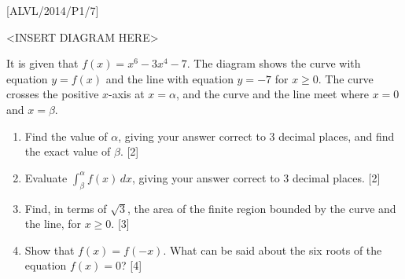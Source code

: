\item {[}ALVL/2014/P1/7{]}
\noindent \begin{center}
<INSERT DIAGRAM HERE>
\par\end{center}

It is given that $f\left(x\right)=x^{6}-3x^{4}-7$. The diagram shows
the curve with equation $y=f\left(x\right)$ and the line with equation
$y=-7$ for $x\geq0$. The curve crosses the positive $x$-axis at
$x=\alpha$, and the curve and the line meet where $x=0$ and $x=\beta$. 
\begin{enumerate}
\item Find the value of $\alpha$, giving your answer correct to 3 decimal
places, and find the exact value of $\beta$.\hfill{} {[}2{]}
\item Evaluate $\int_{\beta}^{\alpha}f\left(x\right)\,dx$, giving your
answer correct to 3 decimal places.\hfill{} {[}2{]}
\item Find, in terms of $\sqrt{3}$, the area of the finite region bounded
by the curve and the line, for $x\geq0$. \hfill{}{[}3{]}
\item Show that $f\left(x\right)=f\left(-x\right)$. What can be said about
the six roots of the equation $f\left(x\right)=0$? \hfill{}{[}4{]}
\end{enumerate}
